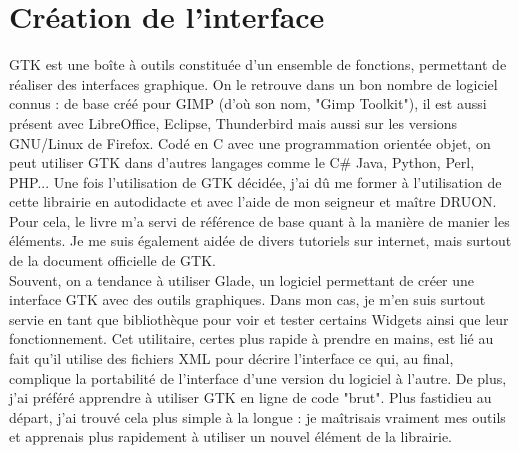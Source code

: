 \documentclass[11pt,french,a4paper]{report}
\begin{document}
    \section{Création de l'interface}
GTK est une boîte à outils constituée d'un ensemble de fonctions, permettant de réaliser des interfaces graphique. On le retrouve
dans un bon nombre de logiciel connus : de base créé pour GIMP (d'où son nom, "Gimp Toolkit"), il est aussi présent avec LibreOffice, Eclipse, Thunderbird mais aussi
sur les versions GNU/Linux de Firefox. Codé en C avec une programmation orientée objet, on peut utiliser GTK dans d'autres langages comme le C# Java, Python, Perl, PHP...
Une fois l'utilisation de GTK décidée, j'ai dû me former à l'utilisation de cette librairie en autodidacte et avec l'aide de mon seigneur et maître DRUON.
Pour cela, le livre %
m'a servi de référence de base quant à la manière de manier les éléments. Je me suis également aidée de divers tutoriels sur internet, mais surtout 
de la document officielle de GTK. %
\\
Souvent, on a tendance à utiliser Glade, un logiciel permettant de créer une interface GTK avec des outils graphiques. Dans mon cas, je m'en suis surtout servie 
en tant que bibliothèque pour voir et tester certains Widgets ainsi que leur fonctionnement. Cet utilitaire, certes plus rapide à prendre en mains, est lié 
au fait qu'il utilise des fichiers XML pour décrire l'interface ce qui, au final, complique la portabilité de l'interface d'une version du logiciel à l'autre. 
De plus, j'ai préféré apprendre à utiliser GTK en ligne de code "brut". Plus fastidieu au départ, j'ai trouvé cela plus simple à la longue : je maîtrisais vraiment 
mes outils et apprenais plus rapidement à utiliser un nouvel élément de la librairie.  
\end{document}

